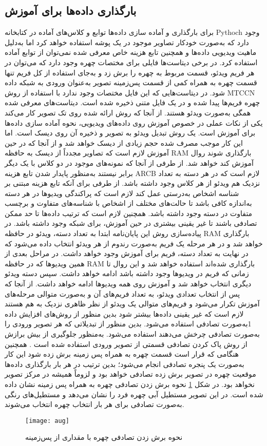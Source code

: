 \subsection{بارگذاری داده‌ها برای آموزش}
برای بارگذاری و آماده سازی داده‌ها توابع و کلاس‌های آماده در کتابخانه Pythoch وجود دارد که به‌صورت خودکار تصاویر موجود در یک پوشه استفاده خواهد کرد اما به‌دلیل ماهیت ویدیویی داده‌ها و همچنین تابع هزینه خاص معرفی شده نمی‌توان از توابع آماده استفاده کرد.
در برخی دیتاست‌ها فایلی برای مختصات چهره وجود دارد که می‌توان در هر فریم ویدئو، قسمت مربوط به چهره را برش زد و به‌جای استفاده از کل فریم تنها قسمت چهره به همراه کمی از قسمت پس‌زمینه تصویر به‌عنوان ورودی به شبکه داده شود. در دیتاست‌هایی که این فایل مختصات وجود ندارد با استفاده از روش MTCCN
\cite{zhang2016joint}
 چهره فریم‌ها پیدا شده و در یک فایل متنی ذخیره شده است.
دیتاست‌های معرفی شده همگی به‌صورت ویدئو هستند. از آنجا که روش ارائه شده روی تک تصویر کار می‌کند یکی از نکات عملی در خصوص آموزش روی داده‌های ویدیویی، نحوه آماده سازی داده‌ها برای آموزش است. یک روش تبدیل ویدئو به تصویر و ذخیره آن روی دیسک است. اما این کار موجب مصرف شده حجم زیادی از دیسک خواهد شد و از آنجا که در حین آموزش لازم است که تصاویر مجدداً از دیسک به حافظه RAM بارگذاری شوند روال آموزش کند خواهد شد.
از طرفی از آنجا که نمونه‌های موجود در دو کلاس با یک دیگر برابر نیستند به‌منظور پایدار شدن تابع هزینه ARCB لازم است که در هر دسته به تعداد نزدیک هم ویدئو از هر کلاس وجود داشته باشد. از طرفی برای آنکه تابع هزینه مبتنی بر شناسه اشخاص به‌درستی عمل کند لازم است که پراکندگی ویدیوها در هر دسته به‌اندازه کافی باشد تا حالت‌های مختلف از اشخاص با شناسه‌های متفاوت و برچسب متفاوت در دسته وجود داشته باشد. همچنین لازم است که ترتیب داده‌ها تا حد ممکن تصادفی باشند تا غیر یقینی بیشتری در حین آموزش، برای شبکه وجود داشته باشد. 
در پیاده‌سازی روش این پایان‌نامه ابتدا به تعداد دسته، ویدئو در حافظه RAM بارگذاری خواهد شد و در هر مرحله یک فریم به‌صورت رندوم از هر ویدئو انتخاب داده می‌شود که در نهایت به تعداد دسته، فریم برای آموزش وجود خواهد داشت. در مراحل بعدی از همین ویدیوها که در حافظه RAM بارگذاری شده‌اند استفاده خواهد شد و این روال تا زمانی که فریم در ویدیوها وجود داشته باشد ادامه خواهد داشت. سپس دسته ویدئو دیگری انتخاب خواهد شد و آموزش روی همه ویدیوها ادامه خواهد داشت. 
از آنجا که پس از انتخاب تعدادی ویدئو، به تعداد فریم‌های آن و به‌صورت متوالی مرحله‌های آموزش تکرار می‌شود و فریم‌های متوالی یک ویدئو از نظر ظاهری نزدیک به هم هستند لازم است که غیر یقینی داده‌ها بیشتر شود بدین منظور از روش‌های افزایش داده 1به‌صورت تصادفی استفاده می‌شود. بدین منظور از تبدیلاتی که هر تصویر ورودی را به‌صورت تصادفی چرخش می‌دهند استفاده می‌شود. 
به‌منظور جلوگیری از بیش برازش از روش پاک کردن تصادفی قسمتی از تصویر ورودی استفاده شده است 
\cite{zhong2020random}
. همچنین هنگامی که قرار است قسمت چهره به همراه پس زمینه برش زده شود این کار به‌صورت یک پنجره تصادفی انجام می‌شود؛ بدین ترتیب در هر بار بارگذاری داده‌ها موقعیت چهره در تصویر برش زده تصادفی خواهد بود و لزوماً همیشه در مرکز تصویر نخواهد بود.
در شکل  
\ref{fig:aug}
نحوه برش زدن تصادفی چهره به همراه پس زمینه نشان داده شده است. در این تصویر مستطیل آبی چهره فرد را نشان می‌دهد و مستطیل‌های رنگی به‌صورت تصادفی برای هر بار انتخاب چهره انتخاب می‌شوند. 
\begin{figure}[ht]
	\centerline{\texttt{[image: aug]}}
	\caption{نحوه برش زدن تصادفی چهره با مقداری از پس‌زمینه}
	\label{fig:aug}
\end{figure}


